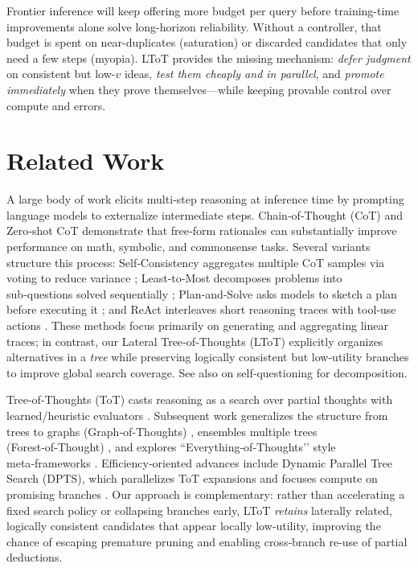 \documentclass{article}
\begin{document}
Frontier inference will keep offering more budget per query before training-time improvements alone solve long-horizon reliability.
Without a controller, that budget is spent on near-duplicates (saturation) or discarded candidates that only need a few steps (myopia).
LToT provides the missing mechanism: \emph{defer judgment} on consistent but low-$v$ ideas, \emph{test them cheaply and in parallel}, and \emph{promote immediately} when they prove themselves—while keeping provable control over compute and errors.

\section{Related Work}
\label{section:prior-work}

A large body of work elicits multi‑step reasoning at inference time by prompting language models to externalize intermediate steps. Chain‑of‑Thought (CoT) \citep{wei2022cot} and Zero‑shot CoT \citep{kojima2022zeroshotcot} demonstrate that free‑form rationales can substantially improve performance on math, symbolic, and commonsense tasks. Several variants structure this process: Self‑Consistency aggregates multiple CoT samples via voting to reduce variance \citep{wang2022selfconsistency}; Least‑to‑Most decomposes problems into sub‑questions solved sequentially \citep{zhou2022ltm}; Plan‑and‑Solve asks models to sketch a plan before executing it \citep{wang2023planandsolve}; and ReAct interleaves short reasoning traces with tool‑use actions \citep{yao2023react}. These methods focus primarily on generating and aggregating linear traces; in contrast, our Lateral Tree‑of‑Thoughts (LToT) explicitly organizes alternatives in a \emph{tree} while preserving logically consistent but low‑utility branches to improve global search coverage. See also \citet{press2022selfask} on self‑questioning for decomposition.

Tree‑of‑Thoughts (ToT) casts reasoning as a search over partial thoughts with learned/heuristic evaluators \citep{yao2023tot}. Subsequent work generalizes the structure from trees to graphs (Graph‑of‑Thoughts) \citep{besta2024got}, ensembles multiple trees (Forest‑of‑Thought) \citep{bi2024fot}, and explores “Everything‑of‑Thoughts’’ style meta‑frameworks \citep{ding2023xot}. Efficiency‑oriented advances include Dynamic Parallel Tree Search (DPTS), which parallelizes ToT expansions and focuses compute on promising branches \citep{ding2025dpts}. Our approach is complementary: rather than accelerating a fixed search policy or collapsing branches early, LToT \emph{retains} laterally related, logically consistent candidates that appear locally low‑utility, improving the chance of escaping premature pruning and enabling cross‑branch re‑use of partial deductions.
\end{document}
